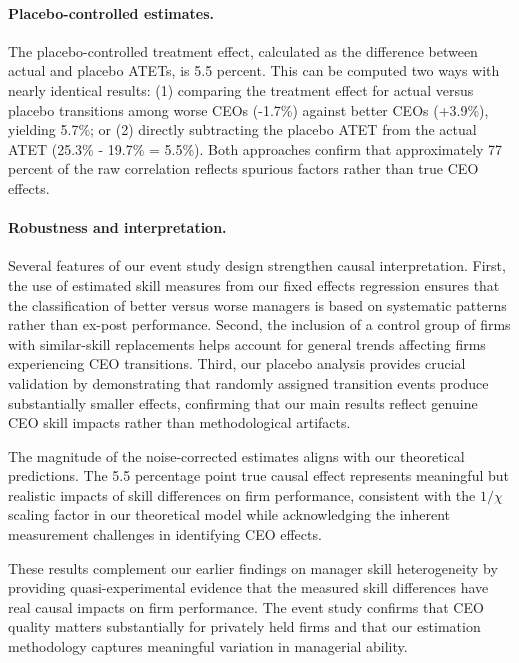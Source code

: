 \documentclass[11pt,a4paper]{article}
\begin{document}
\paragraph{Placebo-controlled estimates.} The placebo-controlled treatment effect, calculated as the difference between actual and placebo ATETs, is 5.5 percent. This can be computed two ways with nearly identical results: (1) comparing the treatment effect for actual versus placebo transitions among worse CEOs (-1.7\%) against better CEOs (+3.9\%), yielding 5.7\%; or (2) directly subtracting the placebo ATET from the actual ATET (25.3\% - 19.7\% = 5.5\%). Both approaches confirm that approximately 77 percent of the raw correlation reflects spurious factors rather than true CEO effects.

\paragraph{Robustness and interpretation.} Several features of our event study design strengthen causal interpretation. First, the use of estimated skill measures from our fixed effects regression ensures that the classification of better versus worse managers is based on systematic patterns rather than ex-post performance. Second, the inclusion of a control group of firms with similar-skill replacements helps account for general trends affecting firms experiencing CEO transitions. Third, our placebo analysis provides crucial validation by demonstrating that randomly assigned transition events produce substantially smaller effects, confirming that our main results reflect genuine CEO skill impacts rather than methodological artifacts.

The magnitude of the noise-corrected estimates aligns with our theoretical predictions. The 5.5 percentage point true causal effect represents meaningful but realistic impacts of skill differences on firm performance, consistent with the $1/\chi$ scaling factor in our theoretical model while acknowledging the inherent measurement challenges in identifying CEO effects.

These results complement our earlier findings on manager skill heterogeneity by providing quasi-experimental evidence that the measured skill differences have real causal impacts on firm performance. The event study confirms that CEO quality matters substantially for privately held firms and that our estimation methodology captures meaningful variation in managerial ability.
\end{document}

